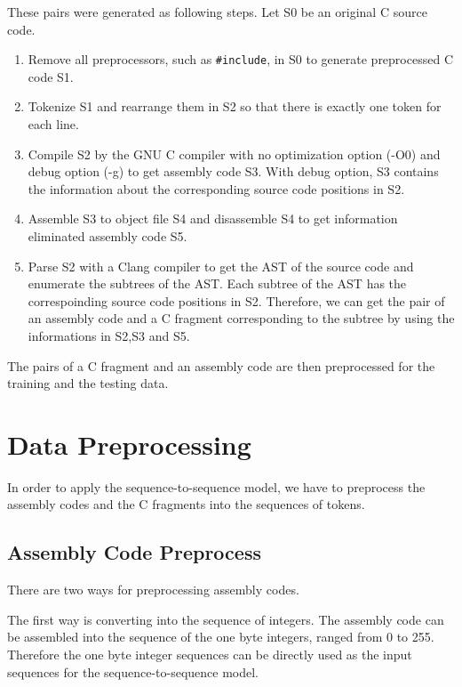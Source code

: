 \documentclass[senior,final,11pt]{iscs-thesis}
\begin{document}
These pairs were generated as following steps. Let S0 be an original C source code.
\begin{enumerate}
\item Remove all preprocessors, such as \texttt{\#include}, in S0 to generate preprocessed C code S1. 
\item Tokenize S1 and rearrange them in S2 so that there is exactly one token for each line. 
\item 
Compile S2 by the GNU C compiler with no optimization option (-O0) and debug option (-g) to get assembly code S3. 
With debug option, S3 contains the information about the corresponding source code positions in S2. 
\item Assemble S3 to object file S4 and disassemble S4 to get information eliminated assembly code S5.
\item 
Parse S2 with a Clang compiler to get the AST of the source code and enumerate the subtrees of the AST.
Each subtree of the AST has the correspoinding source code positions in S2.
Therefore, we can get the pair of an assembly code and a C fragment corresponding to the subtree 
by using the informations in S2,S3 and S5.
\end{enumerate}

The pairs of a C fragment and an assembly code are then preprocessed for the training and the testing data.

\section{Data Preprocessing}

In order to apply the sequence-to-sequence model, 
we have to preprocess the assembly codes and the C fragments into the sequences of tokens.

\subsection{Assembly Code Preprocess}
There are two ways for preprocessing assembly codes.

The first way is converting into the sequence of integers. 
The assembly code can be assembled into the sequence of the one byte integers, ranged from 0 to 255.
Therefore the one byte integer sequences can be directly used as the input sequences for the sequence-to-sequence model.
\end{document}

